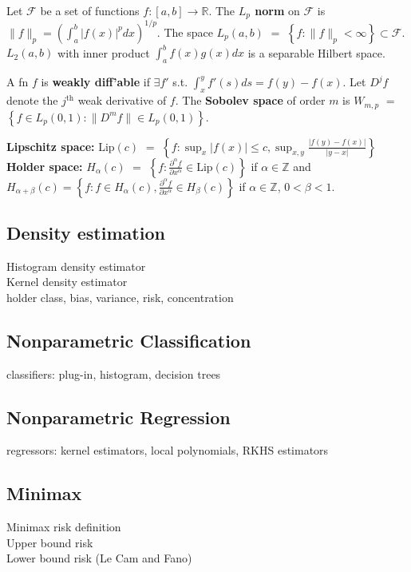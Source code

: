 \documentclass[10pt,twocolumn]{article}
\begin{document}
    Let $\mathcal{F}$ be a set of functions $f:[a,b] \rightarrow \mathbb{R}$.  
    The \textbf{$L_p$ norm} on $\mathcal{F}$ is $\| f \|_p = \left( \int_a^b |f(x)|^p dx  \right)^{1/p}$\hspace{-2mm}. 
    The space $L_p(a,b)$ $=$ $\left\{  f : \| f \|_p < \infty \right\} \subset \mathcal{F}$.
    $L_2(a,b)$ with inner product $\int_a^b f(x)g(x) dx$ is a separable Hilbert space.

    A fn $f$ is \textbf{weakly diff'able} if $\exists f'$ s.t. $\int_x^y f'(s) ds = f(y) - f(x)$.
    Let $D^jf$ denote the $j^{\text{th}}$ weak derivative of $f$.
    The \textbf{Sobolev space} of order $m$ is $W_{m,p}$ $=$ $\left\{ f \in L_p(0,1) : \|D^m f\| \in L_p(0,1) \right\}$.

    \textbf{Lipschitz space:} $\text{Lip}(c)$ $=$ $\left\{ f : \sup_x |f(x)| \leq c, \sup_{x,y} \frac{|f(y)-f(x)|}{|y-x|} \right\}$
    \textbf{Holder space:} $H_{\alpha}(c)$ $=$ $\left\{ f : \frac{\partial^{\alpha} f}{\partial x^{\alpha}} \in \text{Lip}(c) \right\}$ 
        if $\alpha \in \mathbb{Z}$ and\\
    $H_{\alpha+\beta}(c) = \left\{ f : f \in H_{\alpha}(c), \frac{\partial^{\alpha} f}{\partial x^{\alpha}} \in H_{\beta}(c) \right\}$ 
        if $\alpha \in \mathbb{Z}$, $0 < \beta < 1$.

\subsection*{Density estimation}
    Histogram density estimator\\
    Kernel density estimator\\
    holder class, bias, variance, risk, concentration

\subsection*{Nonparametric Classification}
    classifiers: plug-in, histogram, decision trees

\subsection*{Nonparametric Regression}
    regressors: kernel estimators, local polynomials, RKHS estimators

\subsection*{Minimax}
    Minimax risk definition\\
    Upper bound risk\\
    Lower bound risk (Le Cam and Fano)
\end{document}
